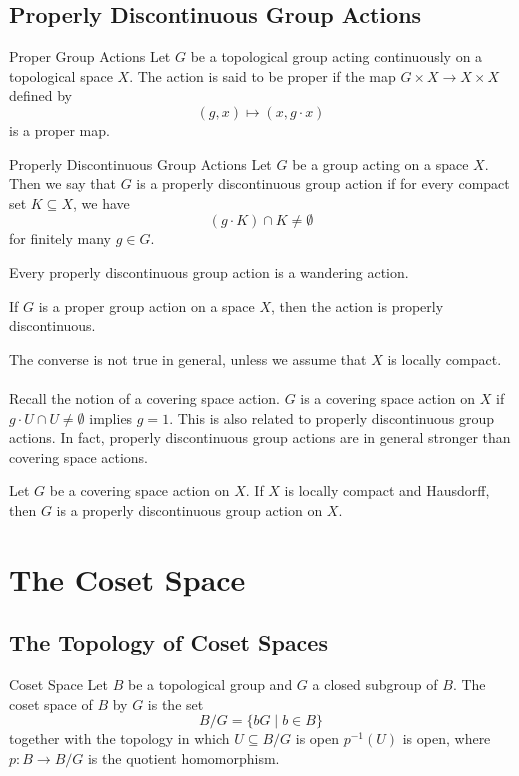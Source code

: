 \documentclass[a4paper]{article}
\begin{document}
\subsection{Properly Discontinuous Group Actions}
\begin{defn}{Proper Group Actions}{} Let $G$ be a topological group acting continuously on a topological space $X$. The action is said to be proper if the map $G\times X\to X\times X$ defined by $$(g,x)\mapsto(x,g\cdot x)$$ is a proper map. 
\end{defn}

\begin{defn}{Properly Discontinuous Group Actions}{} Let $G$ be a group acting on a space $X$. Then we say that $G$ is a properly discontinuous group action if for every compact set $K\subseteq X$, we have $$(g\cdot K)\cap K\neq\emptyset$$ for finitely many $g\in G$. 
\end{defn}

\begin{prp}{}{} Every properly discontinuous group action is a wandering action. 
\end{prp}

\begin{prp}{}{} If $G$ is a proper group action on a space $X$, then the action is properly discontinuous. 
\end{prp}

The converse is not true in general, unless we assume that $X$ is locally compact. \\~\\

Recall the notion of a covering space action. $G$ is a covering space action on $X$ if $g\cdot U\cap U\neq\emptyset$ implies $g=1$. This is also related to properly discontinuous group actions. In fact, properly discontinuous group actions are in general stronger than covering space actions. 

\begin{prp}{}{} Let $G$ be a covering space action on $X$. If $X$ is locally compact and Hausdorff, then $G$ is a properly discontinuous group action on $X$. 
\end{prp}

\pagebreak
\section{The Coset Space}
\subsection{The Topology of Coset Spaces}
\begin{defn}{Coset Space}{} Let $B$ be a topological group and $G$ a closed subgroup of $B$. The coset space of $B$ by $G$ is the set $$B/G=\{bG\;|\;b\in B\}$$ together with the topology in which $U\subseteq B/G$ is open $p^{-1}(U)$ is open, where $p:B\to B/G$ is the quotient homomorphism. 
\end{defn}
\end{document}
